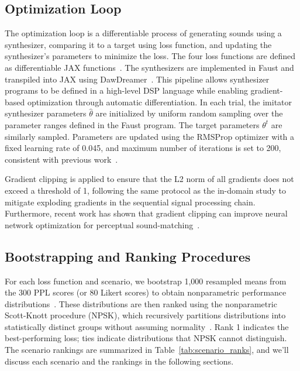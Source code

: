 \documentclass[10pt]{article} %
\begin{document}
\subsection{Optimization Loop}
\label{subsec:optimization}
The optimization loop is a differentiable process of generating sounds using a synthesizer, comparing it to a target using loss function, and updating the synthesizer's parameters to minimize the loss. The four loss functions are defined as differentiable JAX functions~\cite{deepmind2020jax}. The synthesizers are implemented in Faust and transpiled into JAX using DawDreamer~\cite{braun2024dac}. This pipeline allows synthesizer programs to be defined in a high-level DSP language while enabling gradient-based optimization through automatic differentiation. In each trial, the imitator synthesizer parameters $\hat{\theta}$ are initialized by uniform random sampling over the parameter ranges defined in the Faust program. The target parameters $\theta^t$ are similarly sampled. Parameters are updated using the RMSProp optimizer with a fixed learning rate of 0.045, and maximum number of iterations is set to 200, consistent with previous work~\cite{salimi2025evaluating}. 

Gradient clipping is applied to ensure that the L2 norm of all gradients does not exceed a threshold of 1, following the same protocol as the in-domain study to mitigate exploding gradients in the sequential signal processing chain. Furthermore, recent work has shown that gradient clipping can improve neural network optimization for perceptual sound-matching~\cite{han2025gradient}. 

\subsection{Bootstrapping and Ranking Procedures}
\label{sec:bootstrapping_ranking}
For each loss function and scenario, we bootstrap 1,000 resampled means from the 300 PPL scores (or 80 Likert scores) to obtain nonparametric performance distributions~\cite{chernick2011bootstrap}. These distributions are then ranked using the nonparametric Scott-Knott procedure (NPSK), which recursively partitions distributions into statistically distinct groups without assuming normality~\cite{tantithamthavorn2017mvt,tantithamthavorn2018optimization}. Rank 1 indicates the best-performing loss; ties indicate distributions that NPSK cannot distinguish. The scenario rankings are summarized in Table~\ref{tab:scenario_ranks}, and we'll discuss each scenario and the rankings in the following sections.
\end{document}

